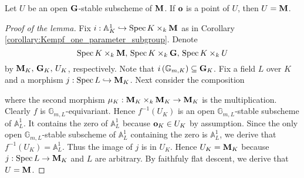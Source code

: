 \begin{lemma}\label{lemma:if_open_group_stable_subscheme_of_Kempf_monoid_contains_zero_then_it_is_whole_monoid}
Let $U$ be an open $\mathbf{G}$-stable subscheme of $\mathbf{M}$. If $\mathbf{o}$ is a point of $U$, then $U = \mathbf{M}$.
\end{lemma}
\begin{proof}[Proof of the lemma]
Fix $i:\mathbb{A}^1_K \hookrightarrow \mathrm{Spec}\, K\times_k\mathbf{M}$ as in Corollary \ref{corollary:Kempf_one_parameter_subgroup}. Denote
$$\mathrm{Spec}\, K\times_k \mathbf{M},\,\mathrm{Spec}\, K\times_k \mathbf{G},\,\mathrm{Spec}\, K\times_kU$$
by $\mathbf{M}_K,\,\mathbf{G}_K,\,U_K$, respectively. Note that $i\left(\mathbb{G}_{m,K}\right)\subseteq \mathbf{G}_K$. Fix a field $L$ over $K$ and a morphism $j:\mathrm{Spec}\, L \hookrightarrow \mathbf{M}_K$. Next consider the composition
\begin{center}
\end{center}
where the second morphism $\mu_K:\mathbf{M}_K\times_k \mathbf{M}_K\rightarrow \mathbf{M}_K$ is the multiplication. Clearly $f$ is $\mathbb{G}_{m,L}$-equivariant. Hence $f^{-1}(U_K)$ is an open $\mathbb{G}_{m,L}$-stable subscheme of $\mathbb{A}^1_{L}$. It contains the zero of $\mathbb{A}^1_L$ because $\mathbf{o}_K \in U_K$ by assumption. Since the only open $\mathbb{G}_{m,L}$-stable subscheme of $\mathbb{A}^1_{L}$ containing the zero is $\mathbb{A}^1_{L}$, we derive that $f^{-1}(U_K) = \mathbb{A}^1_{L}$. Thus the image of $j$ is in $U_K$. Hence $U_K = \mathbf{M}_K$ because $j:\mathrm{Spec}\, L\rightarrow \mathbf{M}_K$ and $L$ are arbitrary. By faithfuly flat descent, we derive that $U = \mathbf{M}$.
\end{proof}

